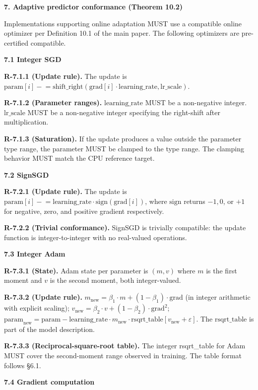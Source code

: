 \documentclass[
]{article}
\begin{document}
\textbf{7. Adaptive predictor conformance (Theorem 10.2)}

Implementations supporting online adaptation MUST use a compatible
online optimizer per Definition 10.1 of the main paper. The following
optimizers are pre-certified compatible.

\textbf{7.1 Integer SGD}

\textbf{R-7.1.1 (Update rule).} The update is
$\text{param}[i] \mathrel{-}= \mathrm{shift\_right}(\text{grad}[i] \cdot \mathrm{learning\_rate}, \mathrm{lr\_scale})$.

\textbf{R-7.1.2 (Parameter ranges).} $\mathrm{learning\_rate}$ MUST
be a non-negative integer. $\mathrm{lr\_scale}$ MUST be a
non-negative integer specifying the right-shift after multiplication.

\textbf{R-7.1.3 (Saturation).} If the update produces a value
outside the parameter type range, the parameter MUST be clamped to
the type range. The clamping behavior MUST match the CPU reference
target.

\textbf{7.2 SignSGD}

\textbf{R-7.2.1 (Update rule).} The update is
$\text{param}[i] \mathrel{-}= \mathrm{learning\_rate} \cdot \mathrm{sign}(\text{grad}[i])$,
where $\mathrm{sign}$ returns $-1, 0$, or $+1$ for negative, zero,
and positive gradient respectively.

\textbf{R-7.2.2 (Trivial conformance).} SignSGD is trivially
compatible: the update function is integer-to-integer with no
real-valued operations.

\textbf{7.3 Integer Adam}

\textbf{R-7.3.1 (State).} Adam state per parameter is $(m, v)$ where
$m$ is the first moment and $v$ is the second moment, both
integer-valued.

\textbf{R-7.3.2 (Update rule).}
$m_{\text{new}} = \beta_1 \cdot m + (1 - \beta_1) \cdot \text{grad}$
(in integer arithmetic with explicit scaling);
$v_{\text{new}} = \beta_2 \cdot v + (1 - \beta_2) \cdot \text{grad}^2$;
$\text{param}_{\text{new}} = \text{param} - \mathrm{learning\_rate} \cdot m_{\text{new}} \cdot \mathrm{rsqrt\_table}[v_{\text{new}} + \varepsilon]$.
The $\mathrm{rsqrt\_table}$ is part of the model description.

\textbf{R-7.3.3 (Reciprocal-square-root table).} The integer
rsqrt\_table for Adam MUST cover the second-moment range observed in
training. The table format follows §6.1.

\textbf{7.4 Gradient computation}
\end{document}
